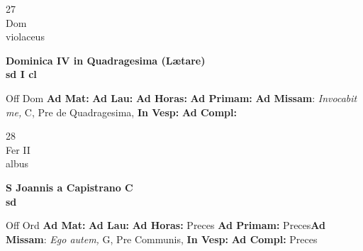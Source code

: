 \documentclass[10pt, openany]{book}
\begin{document}
    \begin{center}
        \begin{minipage}{3.5in}
            \vspace{2em}
            \begin{minipage}{0.5in}
                {\Huge 27} \\
                {\normalsize Dom} \\
                {\normalsize violaceus}
            \end{minipage}
            \begin{minipage}{3.0in}
                \textbf{ \large Dominica IV in Quadragesima (Lætare) \\
                \textnormal{\normalsize sd I cl}} \\ 
            \end{minipage}
            \begin{justify}Off Dom
                \textbf{Ad Mat: }
                \textbf{Ad Lau: }
                \textbf{Ad Horas: }
                \textbf{Ad Primam: }\textbf{Ad Missam}: \textit{Invocabit me,} C, Pre de Quadragesima,  
                \textbf{In Vesp: }
                \textbf{Ad Compl: }
            \end{justify}
        \end{minipage}
    \end{center}

    \begin{center}
        \begin{minipage}{3.5in}
            \vspace{2em}
            \begin{minipage}{0.5in}
                {\Huge 28} \\
                {\normalsize Fer II} \\
                {\normalsize albus}
            \end{minipage}
            \begin{minipage}{3.0in}
                \textbf{ \large S Joannis a Capistrano C \\
                \textnormal{\normalsize sd}} \\ 
            \end{minipage}
            \begin{justify}Off Ord
                \textbf{Ad Mat: }
                \textbf{Ad Lau: }
                \textbf{Ad Horas: }Preces
                \textbf{Ad Primam: }Preces\textbf{Ad Missam}: \textit{Ego autem,} G, Pre Communis,  
                \textbf{In Vesp: }
                \textbf{Ad Compl: }Preces
            \end{justify}
        \end{minipage}
    \end{center}
\end{document}
